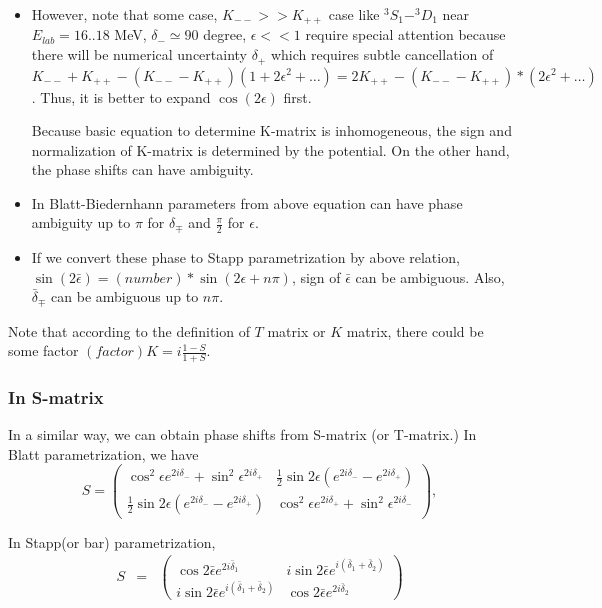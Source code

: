 \documentclass[10pt]{book}
\newcommand{\bea}{\begin{eqnarray}}
\newcommand{\eea}{\end{eqnarray}}
\begin{document}
\begin{itemize}
\item However, note that some case, $K_{--}>>K_{++}$ case
like $^3S_1-^3D_1$ near $E_{lab}=16..18$ MeV, $\delta_{-}\simeq 90$
degree, $\epsilon<<1$ require special attention because there will be numerical uncertainty 
$\delta_{+}$ which requires subtle cancellation of $K_{--}+K_{++}-(K_{--}-K_{++})(1+2\epsilon^2+\dots)= 2K_{++}-(K_{--}-K_{++})*(2\epsilon^2+\dots)$. Thus, it is better to expand $\cos(2\epsilon)$ first. 

Because basic equation to determine K-matrix is inhomogeneous,
the sign and normalization of K-matrix is determined by the potential.
On the other hand, the phase shifts can have ambiguity.

\item In Blatt-Biedernhann parameters from above equation can have 
phase ambiguity up to $\pi$ for $\delta_{\mp}$ and $\frac{\pi}{2}$ for $\epsilon$.

\item If we convert these phase to Stapp parametrization by above relation,
$\sin(2\bar{\epsilon})=(number)*\sin(2\epsilon+n\pi)$, 
sign of $\bar{\epsilon}$ can be ambiguous.
Also, $\bar{\delta}_{\mp}$ can be ambiguous up to $n\pi$.
\end{itemize}

Note that according to the definition of $T$ matrix or $K$ matrix,
there could be some factor $(factor)K=i\frac{1-S}{1+S}$.

\subsubsection{In S-matrix}
In a similar way, we can obtain phase shifts from S-matrix
(or T-matrix.)
In Blatt parametrization, we have 
\begin{equation} 
S= \left(\begin{array}{cc}
   \cos^2\epsilon e^{2i\delta_{-}}+\sin^2\epsilon^{2i\delta_{+}} &
   \frac{1}{2}\sin2\epsilon (e^{2i\delta_{-}}-e^{2i\delta_{+}})   \\
   \frac{1}{2}\sin2\epsilon (e^{2i\delta_{-}}-e^{2i\delta_{+}}) &
   \cos^2\epsilon e^{2i\delta_{+}}+\sin^2\epsilon^{2i\delta_{-}}
   \end{array}
 \right) ,
\end{equation}

In Stapp(or bar) parametrization, 
\bea
S&=&\left(
\begin{array}{cc}
\cos 2\bar{\epsilon} e^{2i\bar{\delta}_1} & i\sin 2\bar{\epsilon} e^{i(\bar{\delta}_1+\bar{\delta}_2)} \\
i\sin 2\bar{\epsilon} e^{i(\bar{\delta}_1+\bar{\delta}_2)} & \cos 2\bar{\epsilon} e^{2i\bar{\delta}_2}
\end{array}
\right)
\eea
\end{document}
